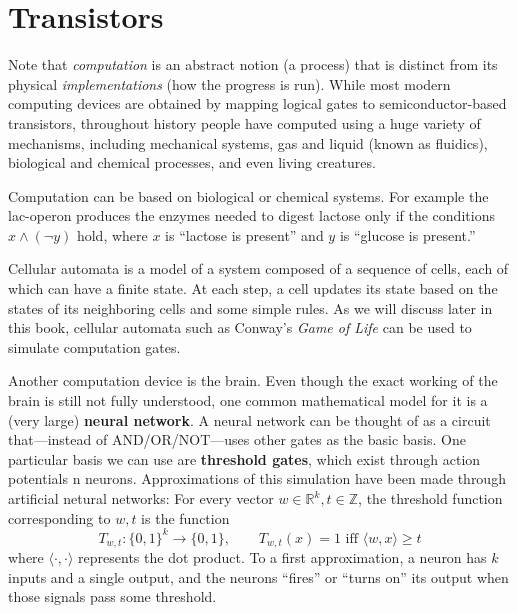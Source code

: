 \section{Transistors}

  Note that \textit{computation} is an abstract notion (a process) that is distinct from its physical \textit{implementations} (how the progress is run). While most modern computing devices are obtained by mapping logical gates to semiconductor-based transistors, throughout history people have computed using a huge variety of mechanisms, including mechanical systems, gas and liquid (known as fluidics), biological and chemical processes, and even living creatures. 

  \begin{example}
    \label{ex:biological-computing}
    Computation can be based on biological or chemical systems. For example the lac-operon produces the enzymes needed to digest lactose only if the conditions $x \wedge (\lnot y)$ hold, where $x$ is ``lactose is present'' and $y$ is ``glucose is present.''
  \end{example}

  \begin{example}
    \label{ex:cellular-automata-and-the-game-of-life}
    Cellular automata is a model of a system composed of a sequence of cells, each of which can have a finite state. At each step, a cell updates its state based on the states of its neighboring cells and some simple rules. As we will discuss later in this book, cellular automata such as Conway’s \textit{Game of Life} can be used to simulate computation gates.
  \end{example}

  \begin{example}
    \label{ex:neural-network}
    Another computation device is the brain. Even though the exact working of the brain is still not fully understood, one common mathematical model for it is a (very large) \textbf{neural network}. A neural network can be thought of as a circuit that---instead of AND/OR/NOT---uses other gates as the basic basis. One particular basis we can use are \textbf{threshold gates}, which exist through action potentials n neurons. Approximations of this simulation have been made through artificial netural networks: For every vector $w \in \mathbb{R}^k, t \in \mathbb{Z}$, the threshold function corresponding to $w, t$ is the function 
    \begin{equation}
      T_{w, t} :\{0,1\}^k \to \{0,1\}, \qquad T_{w, t}(x) = 1 \text{ iff } \langle w, x \rangle \geq t
    \end{equation}
    where $\langle \cdot, \cdot \rangle$ represents the dot product. To a first approximation, a neuron has $k$ inputs and a single output, and the neurons “fires” or “turns on” its output when those signals pass some threshold. 
  \end{example}

